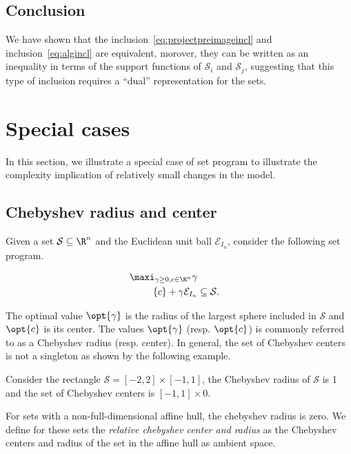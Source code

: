 \documentclass[11pt,twoside,a4paper,openright]{uclouvain-thesis}
\begin{document}
\subsection{Conclusion}
We have shown that the inclusion~\eqref{eq:projectpreimageincl} and inclusion~\eqref{eq:algincl} are equivalent,
morover, they can be written as an inequality in terms of the support functions
of $\mathcal{S}_i$ and $\mathcal{S}_j$, suggesting that this type of inclusion
requires a ``dual'' representation for the sets.

\section{Special cases}
\label{sec:special}

In this section, we illustrate a special case of set program to illustrate
the complexity implication of relatively small changes in the model.

\subsection{Chebyshev radius and center}
\label{sec:cheby}

Given a set $\mathcal{S} \subseteq \R^n$ and the Euclidean unit ball $\mathcal{E}_{I_n}$,
consider the following set program.
\begin{myprog}
\begin{align}
  \notag
  \maxi_{\gamma \ge 0, c \in \R^n} \gamma\\
  \notag
  \{c\} + \gamma \mathcal{E}_{I_n} & \subseteq \mathcal{S}.
\end{align}
  \label{prog:cheby}
\end{myprog}

The optimal value $\opt{\gamma}$ is the radius of the largest sphere included
in $\mathcal{S}$ and $\opt{c}$ is its center.
The values $\opt{\gamma}$ (resp. $\opt{c}$) is commonly referred to as
a Chebyshev radius (resp. center).
In general, the set of Chebyshev centers is not a singleton as shown by the following example.

\begin{myexem}
  Consider the rectangle $\mathcal{S} = [-2, 2] \times [-1, 1]$,
  the Chebyshev radius of $\mathcal{S}$ is 1
  and the set of Chebyshev centers is $[-1, 1] \times {0}$.
\end{myexem}

For sets with a non-full-dimensional affine hull, the chebyshev radius is zero.
We define for these sets the \emph{relative chebyshev center and radius}
as the Chebyshev centers and radius of the set in the affine hull as ambient space.
\end{document}
